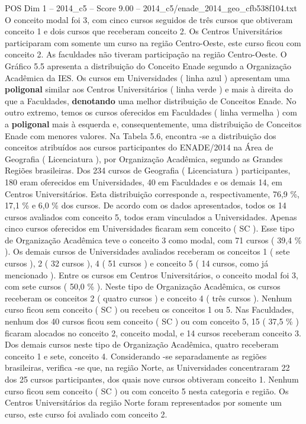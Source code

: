 \begin{textsample}{POS Dim 1 – 2014\_c5 – Score 9.00 – 2014\_c5/enade\_2014\_geo\_cfb538f104.txt}
O conceito modal foi 3, com cinco cursos seguidos de três cursos que obtiveram conceito 1 e dois cursos que receberam conceito 2.
Os Centros Universitários participaram com somente um curso na região Centro-Oeste, este curso ficou com conceito 2.
As faculdades não tiveram participação na região Centro-Oeste.
O Gráfico 5.5 apresenta a distribuição do Conceito Enade segundo a Organização Acadêmica da IES.
Os cursos em Universidades ( linha azul ) apresentam uma \textbf{poligonal} similar aos Centros Universitários ( linha verde ) e mais à direita do que a Faculdades, \textbf{denotando} uma melhor distribuição de Conceitos Enade.
No outro extremo, temos os cursos oferecidos em Faculdades ( linha vermelha ) com a \textbf{poligonal} mais à esquerda e, consequentemente, uma distribuição de Conceitos Enade com menores valores.
Na Tabela 5.6, encontra -se a distribuição dos conceitos atribuídos aos cursos participantes do ENADE/2014 na Área de Geografia ( Licenciatura ), por Organização Acadêmica, segundo as Grandes Regiões brasileiras.
Dos 234 cursos de Geografia ( Licenciatura ) participantes, 180 eram oferecidos em Universidades, 40 em Faculdades e os demais 14, em Centros Universitários.
Esta distribuição corresponde a, respectivamente, 76,9 \%, 17,1 \% e 6,0 \% dos cursos.
De acordo com os dados apresentados, todos os 14 cursos avaliados com conceito 5, todos eram vinculados a Universidades.
Apenas cinco cursos oferecidos em Universidades ficaram sem conceito ( SC ).
Esse tipo de Organização Acadêmica teve o conceito 3 como modal, com 71 cursos ( 39,4 \% ).
Os demais cursos de Universidades avaliados receberam os conceitos 1 ( sete cursos ), 2 ( 32 cursos ), 4 ( 51 cursos ) e conceito 5 ( 14 cursos, como já mencionado ).
Entre os cursos em Centros Universitários, o conceito modal foi 3, com sete cursos ( 50,0 \% ).
Neste tipo de Organização Acadêmica, os cursos receberam os conceitos 2 ( quatro cursos ) e conceito 4 ( três cursos ).
Nenhum curso ficou sem conceito ( SC ) ou recebeu os conceitos 1 ou 5.
Nas Faculdades, nenhum dos 40 cursos ficou sem conceito ( SC ) ou com conceito 5, 15 ( 37,5 \% ) ficaram alocados no conceito 2, conceito modal, e 14 cursos receberam conceito 3.
Dos demais cursos neste tipo de Organização Acadêmica, quatro receberam conceito 1 e sete, conceito 4.
Considerando -se separadamente as regiões brasileiras, verifica -se que, na região Norte, as Universidades concentraram 22 dos 25 cursos participantes, dos quais nove cursos obtiveram conceito 1.
Nenhum curso ficou sem conceito ( SC ) ou com conceito 5 nesta categoria e região.
Os Centros Universitários da região Norte foram representados por somente um curso, este curso foi avaliado com conceito 2.

\end{textsample}
